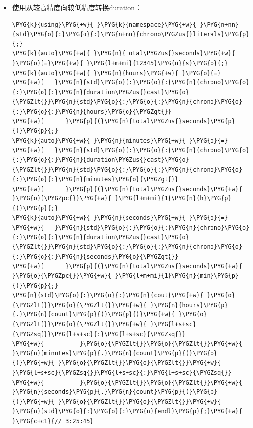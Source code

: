 \begin{itemize}

\item 使用从较高精度向较低精度转换duration：



\begin{codeblockbg}
\begin{Verbatim}[commandchars=\\\{\},breaklines=true,breakanywhere=true,fontsize=\codefont,xleftmargin=17bp]
\PYG{k}{using}\PYG{+w}{ }\PYG{k}{namespace}\PYG{+w}{ }\PYG{n+nn}{std}\PYG{o}{:}\PYG{o}{:}\PYG{n+nn}{chrono\PYGZus{}literals}\PYG{p}{;}
\PYG{k}{auto}\PYG{+w}{ }\PYG{n}{total\PYGZus{}seconds}\PYG{+w}{ }\PYG{o}{=}\PYG{+w}{ }\PYG{l+m+mi}{12345}\PYG{n}{s}\PYG{p}{;}
\PYG{k}{auto}\PYG{+w}{ }\PYG{n}{hours}\PYG{+w}{ }\PYG{o}{=}
\PYG{+w}{   }\PYG{n}{std}\PYG{o}{:}\PYG{o}{:}\PYG{n}{chrono}\PYG{o}{:}\PYG{o}{:}\PYG{n}{duration\PYGZus{}cast}\PYG{o}{\PYGZlt{}}\PYG{n}{std}\PYG{o}{:}\PYG{o}{:}\PYG{n}{chrono}\PYG{o}{:}\PYG{o}{:}\PYG{n}{hours}\PYG{o}{\PYGZgt{}}
\PYG{+w}{      }\PYG{p}{(}\PYG{n}{total\PYGZus{}seconds}\PYG{p}{)}\PYG{p}{;}
\PYG{k}{auto}\PYG{+w}{ }\PYG{n}{minutes}\PYG{+w}{ }\PYG{o}{=}
\PYG{+w}{   }\PYG{n}{std}\PYG{o}{:}\PYG{o}{:}\PYG{n}{chrono}\PYG{o}{:}\PYG{o}{:}\PYG{n}{duration\PYGZus{}cast}\PYG{o}{\PYGZlt{}}\PYG{n}{std}\PYG{o}{:}\PYG{o}{:}\PYG{n}{chrono}\PYG{o}{:}\PYG{o}{:}\PYG{n}{minutes}\PYG{o}{\PYGZgt{}}
\PYG{+w}{      }\PYG{p}{(}\PYG{n}{total\PYGZus{}seconds}\PYG{+w}{ }\PYG{o}{\PYGZpc{}}\PYG{+w}{ }\PYG{l+m+mi}{1}\PYG{n}{h}\PYG{p}{)}\PYG{p}{;}
\PYG{k}{auto}\PYG{+w}{ }\PYG{n}{seconds}\PYG{+w}{ }\PYG{o}{=}
\PYG{+w}{   }\PYG{n}{std}\PYG{o}{:}\PYG{o}{:}\PYG{n}{chrono}\PYG{o}{:}\PYG{o}{:}\PYG{n}{duration\PYGZus{}cast}\PYG{o}{\PYGZlt{}}\PYG{n}{std}\PYG{o}{:}\PYG{o}{:}\PYG{n}{chrono}\PYG{o}{:}\PYG{o}{:}\PYG{n}{seconds}\PYG{o}{\PYGZgt{}}
\PYG{+w}{      }\PYG{p}{(}\PYG{n}{total\PYGZus{}seconds}\PYG{+w}{ }\PYG{o}{\PYGZpc{}}\PYG{+w}{ }\PYG{l+m+mi}{1}\PYG{n}{min}\PYG{p}{)}\PYG{p}{;}
\PYG{n}{std}\PYG{o}{:}\PYG{o}{:}\PYG{n}{cout}\PYG{+w}{ }\PYG{o}{\PYGZlt{}}\PYG{o}{\PYGZlt{}}\PYG{+w}{ }\PYG{n}{hours}\PYG{p}{.}\PYG{n}{count}\PYG{p}{(}\PYG{p}{)}\PYG{+w}{ }\PYG{o}{\PYGZlt{}}\PYG{o}{\PYGZlt{}}\PYG{+w}{ }\PYG{l+s+sc}{\PYGZsq{}}\PYG{l+s+sc}{:}\PYG{l+s+sc}{\PYGZsq{}}
\PYG{+w}{          }\PYG{o}{\PYGZlt{}}\PYG{o}{\PYGZlt{}}\PYG{+w}{ }\PYG{n}{minutes}\PYG{p}{.}\PYG{n}{count}\PYG{p}{(}\PYG{p}{)}\PYG{+w}{ }\PYG{o}{\PYGZlt{}}\PYG{o}{\PYGZlt{}}\PYG{+w}{ }\PYG{l+s+sc}{\PYGZsq{}}\PYG{l+s+sc}{:}\PYG{l+s+sc}{\PYGZsq{}}
\PYG{+w}{          }\PYG{o}{\PYGZlt{}}\PYG{o}{\PYGZlt{}}\PYG{+w}{ }\PYG{n}{seconds}\PYG{p}{.}\PYG{n}{count}\PYG{p}{(}\PYG{p}{)}\PYG{+w}{ }\PYG{o}{\PYGZlt{}}\PYG{o}{\PYGZlt{}}\PYG{+w}{ }\PYG{n}{std}\PYG{o}{:}\PYG{o}{:}\PYG{n}{endl}\PYG{p}{;}\PYG{+w}{ }\PYG{c+c1}{// 3:25:45}
\end{Verbatim}
\end{codeblockbg}



\end{itemize}
